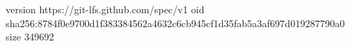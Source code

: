 version https://git-lfs.github.com/spec/v1
oid sha256:8784f0e9700d1f383384562a4632c6cb945cf1d35fab5a3af697d019287790a0
size 349692
